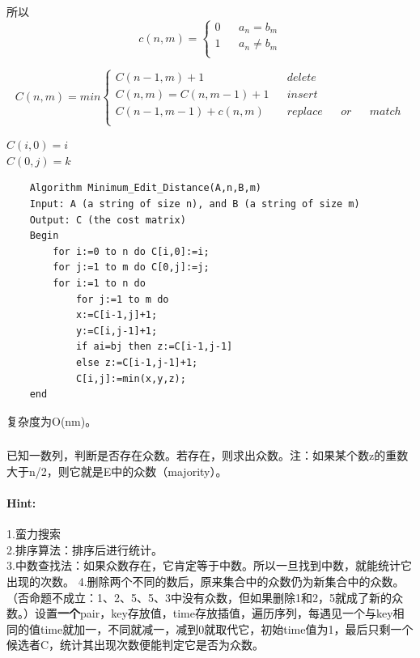 \documentclass{article}
\begin{document}
    所以
$$ c(n,m)=\left\{
    \begin{aligned}
    0 &  & a_n =  b_m\\
    1&  &a_n \ne b_m\\
    \end{aligned}
    \right.
    $$
    
    $$C(n,m)=min\left\{
    \begin{aligned}
    C(n-1, m)+1 &  & delete\\
    C(n, m) = C(n, m-1)+1&  &insert\\
    C(n-1, m-1) + c(n,m)&  &replace&  &or&  &match \\
    \end{aligned}
    \right.
$$

    $C(i,0) = i$\\
    $C(0,j) = k$ \\
    \lstset{language=C}
    \begin{lstlisting}
    Algorithm Minimum_Edit_Distance(A,n,B,m)
    Input: A (a string of size n), and B (a string of size m)
    Output: C (the cost matrix)
    Begin
        for i:=0 to n do C[i,0]:=i;
        for j:=1 to m do C[0,j]:=j;
        for i:=1 to n do
            for j:=1 to m do
            x:=C[i-1,j]+1;
            y:=C[i,j-1]+1;
            if ai=bj then z:=C[i-1,j-1]
            else z:=C[i-1,j-1]+1;
            C[i,j]:=min(x,y,z);
    end

    \end{lstlisting}
     复杂度为O(nm)。
     
       \subsubsection{}已知一数列，判断是否存在众数。若存在，则求出众数。注：如果某个数z的重数大于n/2，则它就是E中的众数（majority）。

     \paragraph{Hint:}1.蛮力搜索\\
        2.排序算法：排序后进行统计。\\
        3.中数查找法：如果众数存在，它肯定等于中数。所以一旦找到中数，就能统计它出现的次数。
        4.删除两个不同的数后，原来集合中的众数仍为新集合中的众数。（否命题不成立：1、2、5、5、3中没有众数，但如果删除1和2，5就成了新的众数。）设置\textbf{一个}pair，key存放值，time存放插值，遍历序列，每遇见一个与key相同的值time就加一，不同就减一，减到0就取代它，初始time值为1，最后只剩一个候选者C，统计其出现次数便能判定它是否为众数。\\
        
\end{document}

